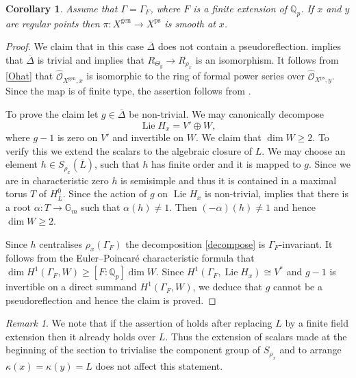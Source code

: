 \documentclass{amsart}
\newtheorem{cor}[prop]{Corollary}
\theoremstyle{definition}
\theoremstyle{remark}
\newtheorem{remar}[prop]{Remark}
\newcommand{\Qp}{\mathbb {Q}_p}
\newcommand{\OO}{\mathcal O}
\newcommand{\Gm}{\mathbb G_m}
\newcommand{\gen}{\mathrm{gen}}
\DeclareMathOperator{\Lie}{Lie}
\newcommand{\ps}{\mathrm{ps}}
\begin{document}
\begin{cor}\label{main_cor_luna} Assume that $\Gamma=\Gamma_F$, where $F$ is a finite extension of $\Qp$.  If $x$ and $y$ are regular points then $\pi: X^{\gen}\rightarrow X^{\ps}$ is smooth at $x$.
\end{cor}
\begin{proof} We claim that in this case $\overline{\Delta}$ does not contain a pseudoreflection.  implies that $\overline{\Delta}$ is trivial and  implies that $R_{\Theta_y}\rightarrow R_{\rho_x}$ is an isomorphism. 
It follows from \eqref{Ohat} that 
$\widehat{\OO}_{X^{\gen},x}$ is isomorphic to the ring of formal 
power series over $\widehat{\OO}_{X^{\ps}, y}$. 
Since the map is of finite type, the assertion follows from
\cite[Theorem 18.63 (iii)]{GW2}.


To prove the claim let $g\in \overline{\Delta}$ be non-trivial. We may canonically decompose 
\begin{equation}\label{decompose}
\Lie H_x= V'\oplus W,
\end{equation}
where $g-1$ is zero on $V'$ and invertible on $W$.
We claim that $\dim W\ge 2$. To verify this we extend the scalars to the algebraic closure of $L$.
We may choose 
an element $h\in S_{\rho_x}(\overline{L})$, such that $h$ has finite order and it is mapped to $g$. Since we
are in characteristic zero $h$ is semisimple and thus it  is  contained in 
a maximal torus $T$ of $H^0_{\overline{L}}$.
Since the action of $g$ on $\Lie H_x$ is non-trivial, 
\cite[Theorem 13.18 (1)]{borel} implies that 
 there is a root $\alpha: T\rightarrow \Gm$ such that $\alpha(h)\neq 1$.  Then $(-\alpha)(h)\neq 1$ and hence $\dim W\ge 2$.

Since $h$ centralises $\rho_x(\Gamma_F)$ the decomposition \eqref{decompose} is $\Gamma_F$-invariant. It follows from the Euler--Poincar\'e characteristic formula that $\dim H^1(\Gamma_F, W)\ge [F:\Qp]\dim W$.
Since $H^1(\Gamma_F, \Lie H_x)\cong V^*$ and $g-1$ is invertible on a direct summand $H^1(\Gamma_F, W)$,  we deduce that $g$ cannot be a pseudoreflection
and hence the claim is proved.
\end{proof} 

\begin{remar} We note that if  
the assertion of  
holds after replacing $L$ by a finite 
field extension then it already holds over $L$. Thus the extension of scalars made at the beginning of the section 
to trivialise the component group of $S_{\rho_x}$ and to arrange $\kappa(x)=\kappa(y)=L$ does not affect this statement.
\end{remar}
\end{document}
